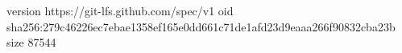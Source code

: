 version https://git-lfs.github.com/spec/v1
oid sha256:279c46226ec7ebae1358ef165e0dd661c71de1afd23d9eaaa266f90832cba23b
size 87544
